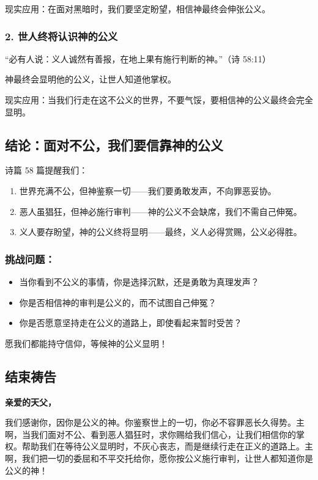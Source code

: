 \documentclass[a4paper, 12pt]{article}
\begin{document}
现实应用：在面对黑暗时，我们要坚定盼望，相信神最终会伸张公义。
\subsubsection*{2. 世人终将认识神的公义}
“必有人说：义人诚然有善报，在地上果有施行判断的神。”（诗 58:11）

神最终会显明他的公义，让世人知道他掌权。

现实应用：当我们行走在这不公义的世界，不要气馁，要相信神的公义最终会完全显明。
\subsection*{结论：面对不公，我们要信靠神的公义}
诗篇 58 篇提醒我们：
\begin{enumerate}
    \item 世界充满不公，但神鉴察一切——我们要勇敢发声，不向罪恶妥协。

    \item 恶人虽猖狂，但神必施行审判——神的公义不会缺席，我们不需自己伸冤。

    \item 义人要存盼望，神的公义终将显明——最终，义人必得赏赐，公义必得胜。

\end{enumerate}
\subsubsection*{挑战问题：}
\begin{itemize}
    \item 当你看到不公义的事情，你是选择沉默，还是勇敢为真理发声？

    \item 你是否相信神的审判是公义的，而不试图自己伸冤？

    \item 你是否愿意坚持走在公义的道路上，即使看起来暂时受苦？

    
\end{itemize}

愿我们都能持守信仰，等候神的公义显明！

\subsection*{结束祷告}
\textbf{亲爱的天父，}

我们感谢你，因你是公义的神。你鉴察世上的一切，你必不容罪恶长久得势。主啊，当我们面对不公、看到恶人猖狂时，求你赐给我们信心，让我们相信你的掌权。帮助我们在等待公义显明时，不灰心丧志，而是继续行走在正义的道路上。主啊，我们把一切的委屈和不平交托给你，愿你按公义施行审判，让世人都知道你是公义的神！
\end{document}
